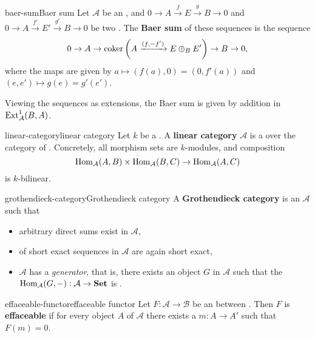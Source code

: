 \begin{topic}{baer-sum}{Baer sum}
    Let $\mathcal{A}$ be an , and $0 \to A \xrightarrow{f} E \xrightarrow{g} B \to 0$ and $0 \to A \xrightarrow{f'} E' \xrightarrow{g'} B \to 0$ be two . The \textbf{Baer sum} of these sequences is the sequence
    \[ 0 \to A \to \operatorname{coker} \left(A \xrightarrow{(f, -f')} E \oplus_B E'\right) \to B \to 0 , \]
    where the maps are given by $a \mapsto (f(a), 0) = (0, f'(a))$ and $(e, e') \mapsto g(e) = g'(e')$.
    
    Viewing the sequences as extensions, the Baer sum is given by addition in $\textup{Ext}_\mathcal{A}^1(B, A)$.
\end{topic}

\begin{topic}{linear-category}{linear category}
    Let $k$ be a . A \textbf{linear category} $\mathcal{A}$ is a   over the category of . Concretely, all morphism sets are $k$-modules, and composition
    \[ \operatorname{Hom}_\mathcal{A}(A, B) \times \operatorname{Hom}_\mathcal{A}(B, C) \to \operatorname{Hom}_\mathcal{A}(A, C) \]
    is $k$-bilinear.
\end{topic}

\begin{topic}{grothendieck-category}{Grothendieck category}
    A \textbf{Grothendieck category} is an  $\mathcal{A}$ such that
    \begin{itemize}
        \item arbitrary direct sums exist in $\mathcal{A}$,
        \item {} of short exact sequences in $\mathcal{A}$ are again short exact,
        \item $\mathcal{A}$ has a \textit{generator}, that is, there exists an object $G$ in $\mathcal{A}$ such that the  $\operatorname{Hom}_\mathcal{A}(G, -) : \mathcal{A} \to \textbf{Set}$ is .
    \end{itemize}
\end{topic}

\begin{topic}{effaceable-functor}{effaceable functor}
    Let $F : \mathcal{A} \to \mathcal{B}$ be an  between . Then $F$ is \textbf{effaceable} if for every object $A$ of $\mathcal{A}$ there exists a  $m : A \to A'$ such that $F(m) = 0$.
\end{topic}

